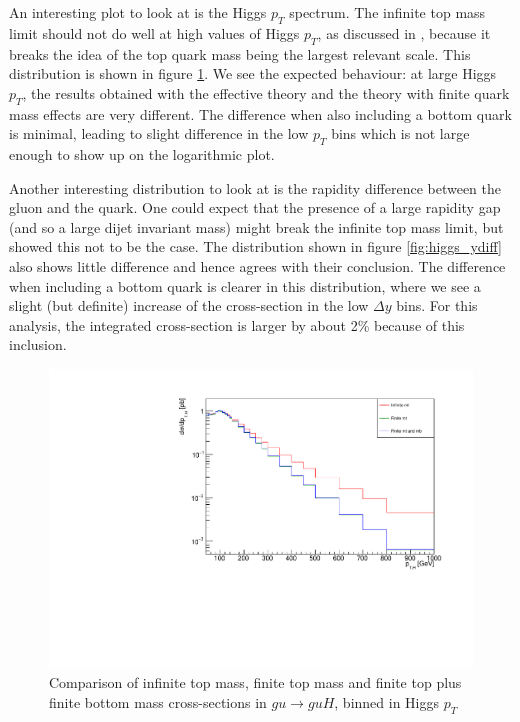 An interesting plot to look at is the Higgs $p_T$ spectrum. The infinite top mass limit should not do well at high values of Higgs $p_T$, as discussed in \cite{Duca2003}, because it breaks the idea of the top quark mass being the largest relevant scale. This distribution is shown in figure \ref{fig:higgs_pt}. We see the expected behaviour: at large Higgs $p_T$, the results obtained with the effective theory and the theory with finite quark mass effects are very different. The difference when also including a bottom quark is minimal, leading to slight difference in the low $p_T$ bins which is not large enough to show up on the logarithmic plot. 

Another interesting distribution to look at is the rapidity difference between the gluon and the quark. One could expect that the presence of a large rapidity gap (and so a large dijet invariant mass) might break the infinite top mass limit, but \cite{Duca2003} showed this not to be the case. The distribution shown in figure \ref{fig:higgs_ydiff} also shows little difference and hence agrees with their conclusion. The difference when including a bottom quark is clearer in this distribution, where we see a slight (but definite) increase of the cross-section in the low $\Delta y$ bins. For this analysis, the integrated cross-section is larger by about 2\% because of this inclusion. 

\begin{figure}[t]
\centering
\includegraphics[scale=0.75]{Images/ptH_gu.pdf}
\caption{Comparison of infinite top mass, finite top mass and finite top plus finite bottom mass cross-sections in $gu \to guH$, binned in Higgs $p_T$ }
\label{fig:higgs_pt}
\end{figure}

